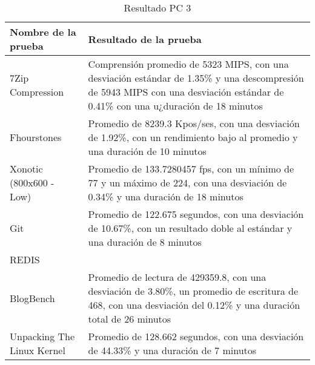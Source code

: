 \documentclass[12pt]{article}
\begin{document}
\begin{table}[!htb]
    \centering
    \begin{tabular}{|p{5cm}|p{9cm}|}
        \hline
        \textbf{Nombre de la prueba} & \textbf{Resultado de la prueba}\\
        \hline
        7Zip Compression & Comprensión promedio de 5323 MIPS, \newline
        con una desviación estándar de 1.35\% \newline
        y una descompresión de 5943 MIPS \newline
        con una desviación estándar de 0.41\% con una u¿duración de 18 minutos\\
        \hline
        Fhourstones & Promedio de 8239.3 Kpos/ses, \newline
        con una desviación de 1.92\%, \newline
        con un rendimiento bajo al promedio \newline
        y una duración de 10 minutos \\
        \hline
        Xonotic (800x600 - Low) & Promedio de 133.7280457 fps, \newline
        con un mínimo de 77 y un máximo de 224, \newline
        con una desviación de 0.34\% \newline
        y una duración de 18 minutos \\
        \hline
        Git & Promedio de 122.675 segundos, \newline
        con una desviación de 10.67\%, \newline
        con un resultado doble al estándar \newline
        y una duración de 8 minutos \\
        \hline
        REDIS &  \\
        \hline
        BlogBench & Promedio de lectura de 429359.8, \newline
        con una desviación de 3.80\%, \newline
        un promedio de escritura de 468, \newline
        con una desviación del 0.12\% \newline
        y una duración total de 26 minutos \\
        \hline
        Unpacking The Linux Kernel & Promedio de 128.662 segundos, \newline
        con una desviación de 44.33\% \newline
        y una duración de 7 minutos \\
        \hline
    \end{tabular}
    \caption{Resultado PC 3}
\end{table}
\end{document}
